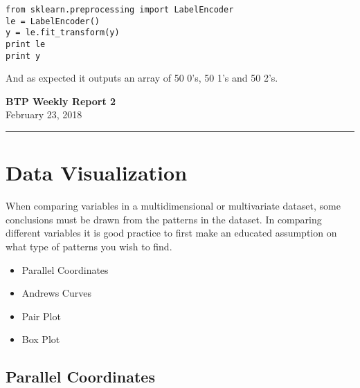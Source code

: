 \documentclass[11pt,letterpaper]{article}
\begin{document}
\begin{lstlisting}
from sklearn.preprocessing import LabelEncoder
le = LabelEncoder()
y = le.fit_transform(y)
print le
print y
\end{lstlisting}

\noindent
And as expected it outputs an array of 50 0's, 50 1's and 50 2's.








\bigskip
\bigskip

\bigskip
\bigskip

\newpage

\pagestyle{plain}

\begin{center}\vspace{-1cm}
\textbf{ \large BTP Weekly Report 2}\\
February 23, 2018
\end{center}

 
\rule{\linewidth}{0.1mm}
\bigskip


\section*{Data Visualization}

When comparing variables in a multidimensional
or multivariate dataset, some conclusions must
be drawn from the patterns in the dataset. In
comparing different variables it is good practice
to first make an educated assumption on what
type of patterns you wish to find. 


\begin{itemize}
\item Parallel Coordinates 
\item Andrews Curves
\item Pair Plot
\item Box Plot
\end{itemize}




\subsection*{Parallel Coordinates}
\end{document}
